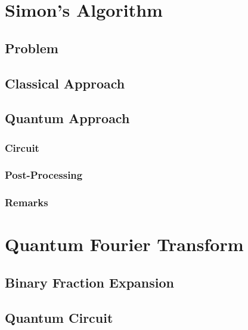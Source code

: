 	\section{Simon's Algorithm} %

		\subsection{Problem} %

		\subsection{Classical Approach} %

		\subsection{Quantum Approach} %

			\subsubsection{Circuit} %

			\subsubsection{Post-Processing} %

			\subsubsection{Remarks} %

	\section{Quantum Fourier Transform} %

		\subsection{Binary Fraction Expansion} %

		\subsection{Quantum Circuit} %

